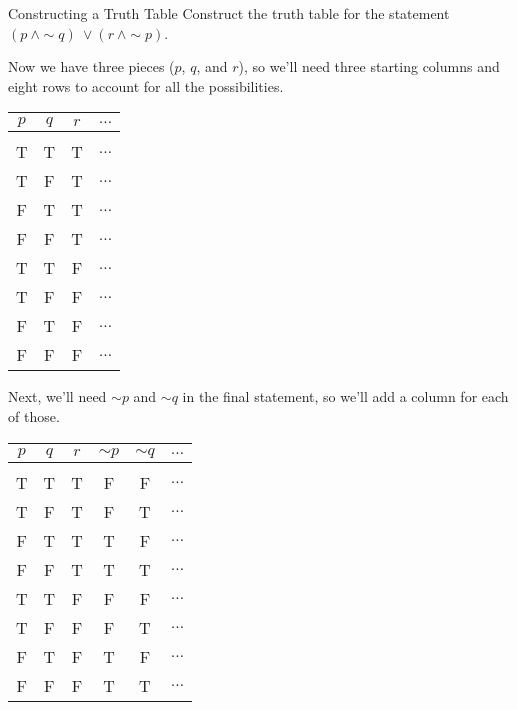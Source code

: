 \begin{example}[https://www.youtube.com/watch?v=Sdh658OUmFk]{Constructing a Truth Table}
Construct the truth table for the statement $(p\ \wedge \sim q)\ \vee (r\ \wedge \sim p)$.

\sol
Now we have three pieces ($p$, $q$, and $r$), so we'll need three starting columns and eight rows to account for all the possibilities.
\begin{center}
\begin{tabular}{|c c c c|}
\hline
$p$ & $q$ & $r$ & $\ldots$\\
\hline
& & &\\
T & T & T & $\ldots$\\
T & F & T & $\ldots$\\
F & T & T & $\ldots$\\
F & F & T & $\ldots$\\
T & T & F & $\ldots$\\
T & F & F & $\ldots$\\
F & T & F & $\ldots$\\
F & F & F & $\ldots$\\
\hline
\end{tabular}
\end{center}

Next, we'll need $\sim p$ and $\sim q$ in the final statement, so we'll add a column for each of those.
\begin{center}
\begin{tabular}{|c c c c c c|}
\hline
$p$ & $q$ & $r$ & $\sim p$ & $\sim q$ & $\ldots$\\
\hline
& & & & &\\
T & T & T & F & F & $\ldots$\\
T & F & T & F & T & $\ldots$\\
F & T & T & T & F & $\ldots$\\
F & F & T & T & T & $\ldots$\\
T & T & F & F & F & $\ldots$\\
T & F & F & F & T & $\ldots$\\
F & T & F & T & F & $\ldots$\\
F & F & F & T & T & $\ldots$\\
\hline
\end{tabular}
\end{center}


\end{example}
